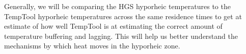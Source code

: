 \documentclass[a4paper]{article}
\begin{document}
Generally, we will be comparing the HGS hyporheic temperatures to the TempTool hyporheic temperatures across the same residence times to get at estimate of how well TempTool is at estimating the correct amount of temperature buffering and lagging. This will help us better understand the mechanisms by which heat moves in the hyporheic zone. 


\printbibliography
\end{document}
